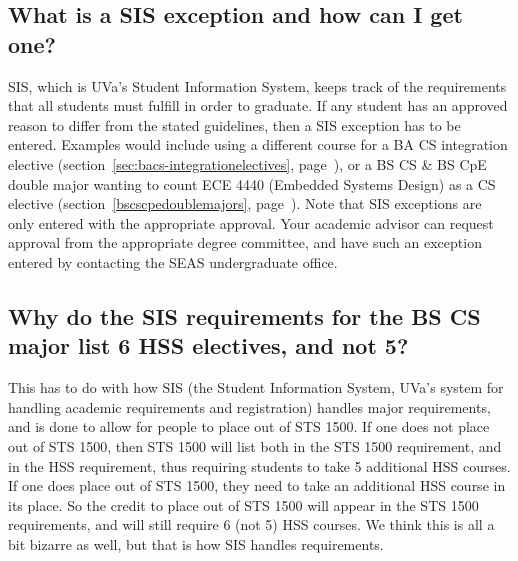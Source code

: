 \subsection{What is a SIS exception and how can I get one?}
\label{sec:sisexceptions}

SIS, which is UVa's Student Information System, keeps track of the
requirements that all students must fulfill in order to graduate.  If
any student has an approved reason to differ from the stated
guidelines, then a SIS exception has to be entered.  Examples would
include using a different course for a BA CS integration elective
(section~\ref{sec:bacs-integrationelectives},
page~\pageref{sec:bacs-integrationelectives}), or a BS CS \& BS CpE
double major wanting to count ECE 4440 (Embedded Systems Design) as a CS
elective (section~\ref{bscscpedoublemajors},
page~\pageref{bscscpedoublemajors}).  Note that SIS exceptions are only
entered with the appropriate approval.  Your academic advisor can
request approval from the appropriate degree committee, and have such
an exception entered by contacting the SEAS undergraduate office.

\iffalse 
\subsection{Why are ECE 4435 and ECE 4440 not showing up in my list of
  fulfilled CS electives?}
\label{sec:sisece4435issue}

ECE 4435 (Computer Architecture \& Design) does not count as a CS
elective, as there is too much overlap with CS 3330 (Computer
Architecture); see section~\ref{bscscpedoublemajors}
(page~\pageref{bscscpedoublemajors}) for details.

As for ECE 4440 (Embedded Systems Design), this has to do with a
restriction in how SIS handles the CS elective requirements.  While it
can count as a CS elective, in order for this to happen a SIS
exception will need to be entered. 
office.  Note that this course can only count as one elective each,
even though it is a 4.5 credit course (meaning that only 3 credits
counts toward the CS elective requirement).

\fi

\subsection{Why do the SIS requirements for the BS CS major list 6 HSS
  electives, and not 5?}
\label{sec:sishssissue}

This has to do with how SIS (the Student Information System, UVa's
system for handling academic requirements and registration) handles
major requirements, and is done to allow for people to place out of
STS 1500. If one does not place out of STS 1500, then STS 1500 will
list both in the STS 1500 requirement, and in the HSS requirement,
thus requiring students to take 5 additional HSS courses. If one does
place out of STS 1500, they need to take an additional HSS course in
its place. So the credit to place out of STS 1500 will appear in the
STS 1500 requirements, and will still require 6 (not 5) HSS courses.
We think this is all a bit bizarre as well, but that is how SIS
handles requirements.

